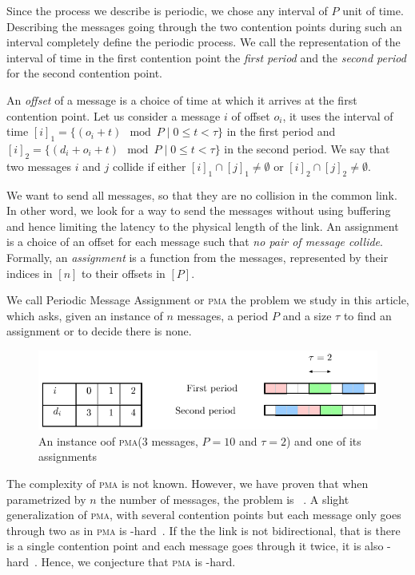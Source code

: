 \documentclass[10pt, conference, letterpaper]{IEEEtran}
\newcommand\pma{\textsc{pma}\xspace}
\begin{document}
Since the process we describe is periodic, we chose any interval of $P$ unit of time.
Describing the messages going through the two contention points during such an interval
completely define the periodic process. We call the representation of the interval
of time in the first contention point the \emph{first period} and the \emph{second period}
for the second contention point.

An \emph{offset} of a message is a choice of time at which it arrives
at the first contention point. Let us consider a message $i$
of offset $o_i$, it uses the interval of time $[i]_1 = \{ (o_i + t) \mod P \mid 0 \leq t < \tau \}$ in the first period and $[i]_2 = \{ (d_i + o_i + t) \mod P \mid 0 \leq t < \tau \}$ in the second period. We say that two messages $i$ and $j$ collide if either $[i]_1 \cap [j]_1 \neq \emptyset $ or $[i]_2 \cap [j]_2 \neq \emptyset $.

We want to send all messages, so that they are no collision in the common link.
In other word, we look for a way to send the messages without using buffering and 
hence limiting the latency to the physical length of the link. An assignment is a
choice of an offset for each message such that \emph{no pair of message collide}.
Formally, an \emph{assignment} is a function from the messages, represented by their indices in $[n]$ to their offsets in $[P]$.  

We call Periodic Message Assignment or \pma the problem we study in this article,
which asks, given an instance of $n$ messages, a period $P$ and a size $\tau$ to find 
an assignment or to decide there is none.
\begin{figure}
\begin{center}
\includegraphics[scale=0.7]{instance}
\end{center}
\caption{An instance oof \pma ($3$ messages, $P= 10$ and $\tau = 2$) and one of its assignments}
\end{figure}
The complexity of \pma is not known. However, we have proven that when parametrized by
$n$ the number of messages, the problem is \FPT~\cite{barth2018deterministic}.
A slight generalization of \pma, with several contention points but each message only goes through two as in \pma is \NP-hard~\cite{barth2018deterministic}. If the the link is not bidirectional, that is there is a single contention point and each message goes through it twice, it is also \NP-hard~\cite{}. Hence, we conjecture that \pma is \NP-hard.
\end{document}
